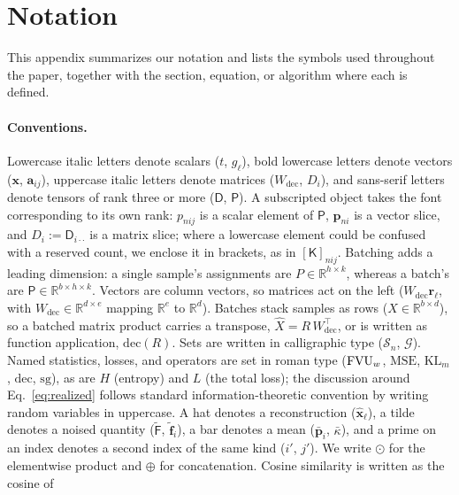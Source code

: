 \appendix

\section{Notation}
\label{app:notation}

This appendix summarizes our notation and lists the symbols used throughout
the paper, together with the section, equation, or algorithm where each is
defined.

\paragraph{Conventions.}
Lowercase italic letters denote scalars ($t$, $g_\ell$), bold lowercase
letters denote vectors ($\mathbf{x}$, $\mathbf{a}_{ij}$), uppercase italic
letters denote matrices ($W_{\mathrm{dec}}$, $D_i$), and sans-serif letters
denote tensors of rank three or more ($\mathsf{D}$, $\mathsf{P}$). A
subscripted object takes the font corresponding to its own rank: $p_{nij}$
is a scalar element of $\mathsf{P}$, $\mathbf{p}_{ni}$ is a vector slice,
and $D_i := \mathsf{D}_{i\cdot\cdot}$ is a matrix slice; where a lowercase
element could be confused with a reserved count, we enclose it in brackets,
as in $[\mathsf{K}]_{nij}$. Batching adds a leading dimension: a single
sample's assignments are $P \in \mathbb{R}^{h\times k}$, whereas a batch's
are $\mathsf{P} \in \mathbb{R}^{b\times h\times k}$. Vectors are column
vectors, so matrices act on the left ($W_{\mathrm{dec}}\mathbf{r}_\ell$,
with $W_{\mathrm{dec}} \in \mathbb{R}^{d\times e}$ mapping $\mathbb{R}^e$
to $\mathbb{R}^d$). Batches stack samples as rows
($X \in \mathbb{R}^{b\times d}$), so a batched matrix product carries a
transpose, $\hat{X} = R\,W_{\mathrm{dec}}^\top$, or is written as function
application, $\mathrm{dec}(R)$. Sets are written in calligraphic type
($\mathcal{S}_n$, $\mathcal{G}$). Named statistics, losses, and operators
are set in roman type ($\mathrm{FVU}_w$, $\mathrm{MSE}$, $\mathrm{KL}_m$,
$\mathrm{dec}$, $\mathrm{sg}$), as are $H$ (entropy) and $L$ (the total
loss); the discussion around Eq.~\eqref{eq:realized} follows
standard information-theoretic convention by writing random variables in
uppercase. A hat denotes a reconstruction ($\hat{\mathbf{x}}_\ell$), a
tilde denotes a noised quantity ($\tilde{\mathsf{F}}$,
$\tilde{\mathbf{f}}_i$), a bar denotes a mean ($\bar{\mathbf{p}}_i$,
$\bar\kappa$), and a prime on an index denotes a second index of the same
kind ($i'$, $j'$). We write $\odot$ for the elementwise product and
$\oplus$ for concatenation. Cosine similarity is written as the cosine of
